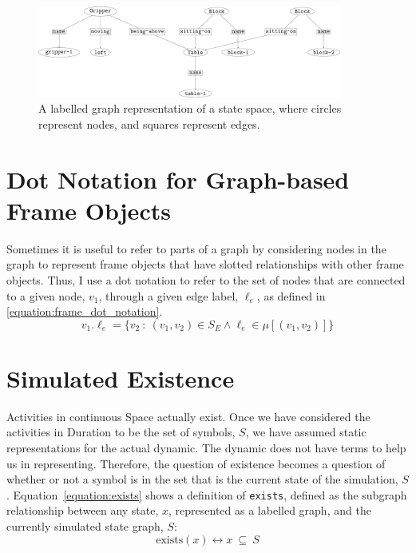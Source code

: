 \begin{figure}
\includegraphics[width=10cm]{gfx/simulation_example_state}
\caption[A labelled graph representation of a state space.]{A labelled graph representation of a state space, where circles represent nodes, and squares represent edges.}
\label{figure:simulation_example_state}
\end{figure}

\section{Dot Notation for Graph-based Frame Objects}

Sometimes it is useful to refer to parts of a graph by considering
nodes in the graph to represent frame objects that have slotted
relationships with other frame objects.  Thus, I use a dot notation to
refer to the set of nodes that are connected to a given node, $v_1$,
through a given edge label, $\ell_e$, as defined in
{\mbox{\autoref{equation:frame_dot_notation}}}.
\begin{equation}
\label{equation:frame_dot_notation}
v_1.\ell_e = \{v_2 ~:~ (v_1, v_2) \in S_E \wedge \ell_e \in \mu[(v_1, v_2)]\}
\end{equation}

\section{Simulated Existence}

Activities in continuous Space actually exist.  Once we have
considered the activities in Duration to be the set of symbols, $S$,
we have assumed static representations for the actual dynamic.  The
dynamic does not have terms to help us in representing.  Therefore,
the question of existence becomes a question of whether or not a
symbol is in the set that is the current state of the simulation, $S$.
Equation~\ref{equation:exists} shows a definition of {\tt exists},
defined as the subgraph relationship between any state, $x$,
represented as a labelled graph, and the currently simulated state
graph, $S$:
\begin{equation}
\label{equation:exists}
\text{exists}(x) \longleftrightarrow x ~{\subseteq}~ S
\end{equation}




